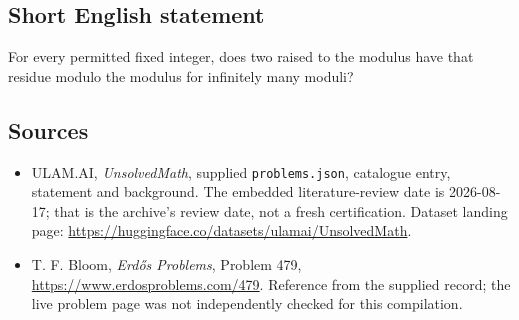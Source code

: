 \documentclass[11pt,a4paper]{article}
\begin{document}
\subsection{Short English statement}

For every permitted fixed integer, does two raised to the modulus have that residue modulo the modulus for infinitely many moduli?

\subsection{Sources}

{\small

\begin{itemize}

\item[\hypertarget{source:statement:1}{S1}] ULAM.AI, \emph{UnsolvedMath}, supplied \texttt{problems.json}, catalogue entry, statement and background. The embedded literature-review date is 2026-08-17; that is the archive’s review date, not a fresh certification. Dataset landing page: \url{https://huggingface.co/datasets/ulamai/UnsolvedMath}.

\item[\hypertarget{source:statement:2}{S2}] T. F. Bloom, \emph{Erdős Problems}, Problem 479, \url{https://www.erdosproblems.com/479}. Reference from the supplied record; the live problem page was not independently checked for this compilation.

\end{itemize}

}

\label{end:statement}
\end{document}

